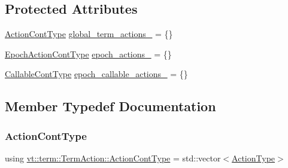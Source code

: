 \subsection*{Protected Attributes}
\begin{DoxyCompactItemize}
\item 
\hyperlink{structvt_1_1term_1_1_term_action_a3b7ff49ce82fc33a7a1ebda8797c02b7}{Action\+Cont\+Type} \hyperlink{structvt_1_1term_1_1_term_action_ab3254cc3e17bf4649173323eedb10ae7}{global\+\_\+term\+\_\+actions\+\_\+} = \{\}
\item 
\hyperlink{structvt_1_1term_1_1_term_action_acefe3cb1e2a2bcf0d530082f53a2bada}{Epoch\+Action\+Cont\+Type} \hyperlink{structvt_1_1term_1_1_term_action_ac552185f8a4f39d516a7caecd5d89d51}{epoch\+\_\+actions\+\_\+} = \{\}
\item 
\hyperlink{structvt_1_1term_1_1_term_action_a802aaa899ce87dc9f8a53d43b202044c}{Callable\+Cont\+Type} \hyperlink{structvt_1_1term_1_1_term_action_a43bab937874af46a501ccf865336fcb9}{epoch\+\_\+callable\+\_\+actions\+\_\+} = \{\}
\end{DoxyCompactItemize}


\subsection{Member Typedef Documentation}
\mbox{\label{structvt_1_1term_1_1_term_action_a3b7ff49ce82fc33a7a1ebda8797c02b7}} 
\subsubsection{\texorpdfstring{Action\+Cont\+Type}{ActionContType}}
{\footnotesize\ttfamily using \hyperlink{structvt_1_1term_1_1_term_action_a3b7ff49ce82fc33a7a1ebda8797c02b7}{vt\+::term\+::\+Term\+Action\+::\+Action\+Cont\+Type} =  std\+::vector$<$\hyperlink{namespacevt_ae0a5a7b18cc99d7b732cb4d44f46b0f3}{Action\+Type}$>$}

\mbox{\label{structvt_1_1term_1_1_term_action_aa4a32326730b20530526e1db6512c017}} 
